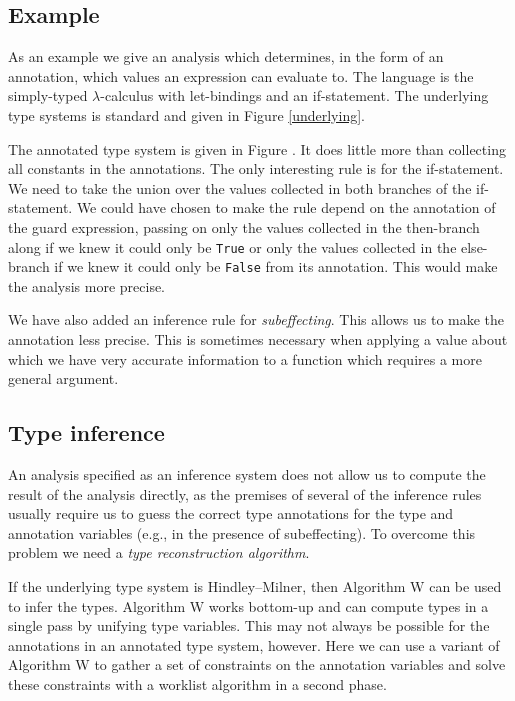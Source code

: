 \documentclass[a4paper]{report}
\begin{document}
\subsection{Example}

As an example we give an analysis which determines, in the form of an annotation, which values an expression can evaluate to. The language is the simply-typed $\lambda$-calculus with let-bindings and an if-statement. The underlying type systems is standard and given in Figure \ref{underlying}.

The annotated type system is given in Figure \label{annotated}. It does little more than collecting all constants in the annotations. The only interesting rule is for the if-statement. We need to take the union over the values collected in both branches of the if-statement. We could have chosen to make the rule depend on the annotation of the guard expression, passing on only the values collected in the then-branch along if we knew it could only be {\tt True} or only the values collected in the else-branch if we knew it could only be {\tt False} from its annotation. This would make the analysis more precise.

We have also added an inference rule for \emph{subeffecting}. This allows us to make the annotation less precise. This is sometimes necessary when applying a value about which we have very accurate information to a function which requires a more general argument.

\subsection{Type inference}

An analysis specified as an inference system does not allow us to compute the result of the analysis directly, as the premises of several of the inference rules usually require us to guess the correct type annotations for the type and annotation variables (e.g., in the presence of subeffecting). To overcome this problem we need a \emph{type reconstruction algorithm}.

If the underlying type system is Hindley--Milner, then Algorithm W can be used to infer the types. Algorithm W works bottom-up and can compute types in a single pass by unifying type variables. This may not always be possible for the annotations in an annotated type system, however. Here we can use a variant of Algorithm W to gather a set of constraints on the annotation variables and solve these constraints with a worklist algorithm in a second phase.
\end{document}
